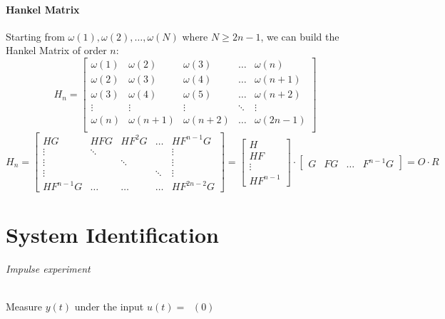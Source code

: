 \documentclass{article}
\DeclareMathOperator{\imp}{impulse(0)}
\let\OldPart\part
\renewcommand{\part}{\newpage\OldPart}
\begin{document}
\subsection{Hankel Matrix}
Starting from $\omega(1),\omega(2),\dots,\omega(N)$ where $N\geq 2n-1$, we can build the Hankel Matrix of order $n$:
\[
H_n=\begin{bmatrix}
\omega(1)&\omega(2)&\omega(3)&\dots&\omega(n)\\
\omega(2)&\omega(3)&\omega(4)&\dots&\omega(n+1)\\
\omega(3)&\omega(4)&\omega(5)&\dots&\omega(n+2)\\
\vdots&\vdots&\vdots&\ddots&\vdots\\
\omega(n)&\omega(n+1)&\omega(n+2)&\dots&\omega(2n-1)\\
\end{bmatrix}
\]
\[
H_n=
\begin{bmatrix}
HG&HFG&HF^2G&\dots&HF^{n-1}G\\
\vdots&\ddots&&&\vdots\\
\vdots&&\ddots&&\vdots\\
\vdots&&&\ddots&\vdots\\
HF^{n-1}G&\dots&\dots&\dots&HF^{2n-2}G
\end{bmatrix}
=
\begin{bmatrix}
H\\HF\\\vdots\\HF^{n-1}
\end{bmatrix}
\cdot
\begin{bmatrix}
G&FG&\dots&F^{n-1}G
\end{bmatrix}
=
O\cdot R
\]

\part{System Identification}
\paragraph{Impulse experiment} Measure $y(t)$ under the input $u(t)=\imp (0)$
\end{document}
